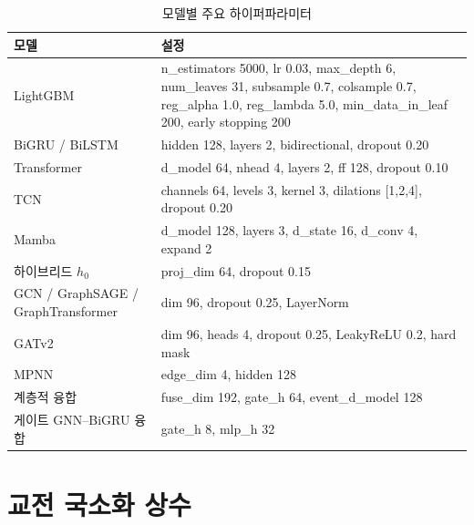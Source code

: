 \begin{table}[htbp]
  \centering
  \caption{모델별 주요 하이퍼파라미터}
  \label{tab:app-hparams}
  \small
  \begin{tabularx}{\linewidth}{@{}lX@{}}
    \toprule
    모델 & 설정 \\
    \midrule
    LightGBM & n\_estimators 5000, lr 0.03, max\_depth 6, num\_leaves 31, subsample 0.7, colsample 0.7, reg\_alpha 1.0, reg\_lambda 5.0, min\_data\_in\_leaf 200, early stopping 200 \\
    BiGRU / BiLSTM & hidden 128, layers 2, bidirectional, dropout 0.20 \\
    Transformer & d\_model 64, nhead 4, layers 2, ff 128, dropout 0.10 \\
    TCN & channels 64, levels 3, kernel 3, dilations [1,2,4], dropout 0.20 \\
    Mamba & d\_model 128, layers 3, d\_state 16, d\_conv 4, expand 2 \\
    하이브리드 $h_0$ & proj\_dim 64, dropout 0.15 \\
    GCN / GraphSAGE / GraphTransformer & dim 96, dropout 0.25, LayerNorm \\
    GATv2 & dim 96, heads 4, dropout 0.25, LeakyReLU 0.2, hard mask \\
    MPNN & edge\_dim 4, hidden 128 \\
    계층적 융합 & fuse\_dim 192, gate\_h 64, event\_d\_model 128 \\
    게이트 GNN--BiGRU 융합 & gate\_h 8, mlp\_h 32 \\
    \bottomrule
  \end{tabularx}
\end{table}

\chapter{교전 국소화 상수}
\label{app:detection}

